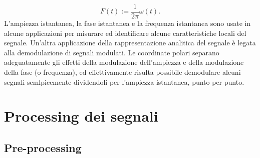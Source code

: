 \documentclass[12pt,a4paper, twoside, openright]{report}
\begin{document}
\begin{equation}
	F(t):= \frac{1}{2 \pi} \omega (t).
\end{equation}
L’ampiezza istantanea, la fase istantanea e la frequenza istantanea sono usate in alcune applicazioni per misurare ed identificare alcune caratteristiche locali del segnale.
Un’altra applicazione della rappresentazione analitica del segnale è legata alla demodulazione di segnali modulati.
Le coordinate polari separano adeguatamente gli effetti della modulazione dell’ampiezza e della modulazione della fase (o frequenza), ed effettivamente risulta possibile demodulare alcuni segnali semlpicemente dividendoli per l'ampiezza istantanea, punto per punto.
 


\section{Processing dei segnali}


\subsection{Pre-processing}
\end{document}
